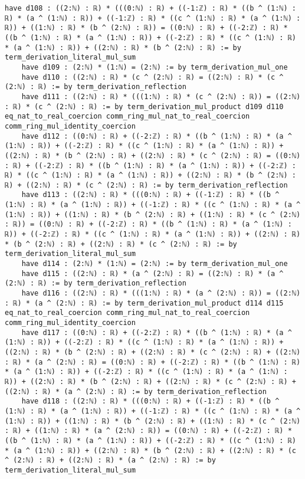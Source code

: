\documentclass{article}
\begin{document}
\begin{tcolorbox}[colback=white!10, width=\linewidth]
\begin{lstlisting}[language=Lean4]
    have d108 : ((2:ℕ) : ℝ) * (((0:ℕ) : ℝ) + ((-1:ℤ) : ℝ) * ((b ^ (1:ℕ) : ℝ) * (a ^ (1:ℕ) : ℝ)) + ((-1:ℤ) : ℝ) * ((c ^ (1:ℕ) : ℝ) * (a ^ (1:ℕ) : ℝ)) + ((1:ℕ) : ℝ) * (b ^ (2:ℕ) : ℝ)) = ((0:ℕ) : ℝ) + ((-2:ℤ) : ℝ) * ((b ^ (1:ℕ) : ℝ) * (a ^ (1:ℕ) : ℝ)) + ((-2:ℤ) : ℝ) * ((c ^ (1:ℕ) : ℝ) * (a ^ (1:ℕ) : ℝ)) + ((2:ℕ) : ℝ) * (b ^ (2:ℕ) : ℝ) := by term_derivation_literal_mul_sum
    have d109 : (2:ℕ) * (1:ℕ) = (2:ℕ) := by term_derivation_mul_one
    have d110 : ((2:ℕ) : ℝ) * (c ^ (2:ℕ) : ℝ) = ((2:ℕ) : ℝ) * (c ^ (2:ℕ) : ℝ) := by term_derivation_reflection
    have d111 : ((2:ℕ) : ℝ) * (((1:ℕ) : ℝ) * (c ^ (2:ℕ) : ℝ)) = ((2:ℕ) : ℝ) * (c ^ (2:ℕ) : ℝ) := by term_derivation_mul_product d109 d110 eq_nat_to_real_coercion comm_ring_mul_nat_to_real_coercion comm_ring_mul_identity_coercion
    have d112 : ((0:ℕ) : ℝ) + ((-2:ℤ) : ℝ) * ((b ^ (1:ℕ) : ℝ) * (a ^ (1:ℕ) : ℝ)) + ((-2:ℤ) : ℝ) * ((c ^ (1:ℕ) : ℝ) * (a ^ (1:ℕ) : ℝ)) + ((2:ℕ) : ℝ) * (b ^ (2:ℕ) : ℝ) + ((2:ℕ) : ℝ) * (c ^ (2:ℕ) : ℝ) = ((0:ℕ) : ℝ) + ((-2:ℤ) : ℝ) * ((b ^ (1:ℕ) : ℝ) * (a ^ (1:ℕ) : ℝ)) + ((-2:ℤ) : ℝ) * ((c ^ (1:ℕ) : ℝ) * (a ^ (1:ℕ) : ℝ)) + ((2:ℕ) : ℝ) * (b ^ (2:ℕ) : ℝ) + ((2:ℕ) : ℝ) * (c ^ (2:ℕ) : ℝ) := by term_derivation_reflection
    have d113 : ((2:ℕ) : ℝ) * (((0:ℕ) : ℝ) + ((-1:ℤ) : ℝ) * ((b ^ (1:ℕ) : ℝ) * (a ^ (1:ℕ) : ℝ)) + ((-1:ℤ) : ℝ) * ((c ^ (1:ℕ) : ℝ) * (a ^ (1:ℕ) : ℝ)) + ((1:ℕ) : ℝ) * (b ^ (2:ℕ) : ℝ) + ((1:ℕ) : ℝ) * (c ^ (2:ℕ) : ℝ)) = ((0:ℕ) : ℝ) + ((-2:ℤ) : ℝ) * ((b ^ (1:ℕ) : ℝ) * (a ^ (1:ℕ) : ℝ)) + ((-2:ℤ) : ℝ) * ((c ^ (1:ℕ) : ℝ) * (a ^ (1:ℕ) : ℝ)) + ((2:ℕ) : ℝ) * (b ^ (2:ℕ) : ℝ) + ((2:ℕ) : ℝ) * (c ^ (2:ℕ) : ℝ) := by term_derivation_literal_mul_sum
    have d114 : (2:ℕ) * (1:ℕ) = (2:ℕ) := by term_derivation_mul_one
    have d115 : ((2:ℕ) : ℝ) * (a ^ (2:ℕ) : ℝ) = ((2:ℕ) : ℝ) * (a ^ (2:ℕ) : ℝ) := by term_derivation_reflection
    have d116 : ((2:ℕ) : ℝ) * (((1:ℕ) : ℝ) * (a ^ (2:ℕ) : ℝ)) = ((2:ℕ) : ℝ) * (a ^ (2:ℕ) : ℝ) := by term_derivation_mul_product d114 d115 eq_nat_to_real_coercion comm_ring_mul_nat_to_real_coercion comm_ring_mul_identity_coercion
    have d117 : ((0:ℕ) : ℝ) + ((-2:ℤ) : ℝ) * ((b ^ (1:ℕ) : ℝ) * (a ^ (1:ℕ) : ℝ)) + ((-2:ℤ) : ℝ) * ((c ^ (1:ℕ) : ℝ) * (a ^ (1:ℕ) : ℝ)) + ((2:ℕ) : ℝ) * (b ^ (2:ℕ) : ℝ) + ((2:ℕ) : ℝ) * (c ^ (2:ℕ) : ℝ) + ((2:ℕ) : ℝ) * (a ^ (2:ℕ) : ℝ) = ((0:ℕ) : ℝ) + ((-2:ℤ) : ℝ) * ((b ^ (1:ℕ) : ℝ) * (a ^ (1:ℕ) : ℝ)) + ((-2:ℤ) : ℝ) * ((c ^ (1:ℕ) : ℝ) * (a ^ (1:ℕ) : ℝ)) + ((2:ℕ) : ℝ) * (b ^ (2:ℕ) : ℝ) + ((2:ℕ) : ℝ) * (c ^ (2:ℕ) : ℝ) + ((2:ℕ) : ℝ) * (a ^ (2:ℕ) : ℝ) := by term_derivation_reflection
    have d118 : ((2:ℕ) : ℝ) * (((0:ℕ) : ℝ) + ((-1:ℤ) : ℝ) * ((b ^ (1:ℕ) : ℝ) * (a ^ (1:ℕ) : ℝ)) + ((-1:ℤ) : ℝ) * ((c ^ (1:ℕ) : ℝ) * (a ^ (1:ℕ) : ℝ)) + ((1:ℕ) : ℝ) * (b ^ (2:ℕ) : ℝ) + ((1:ℕ) : ℝ) * (c ^ (2:ℕ) : ℝ) + ((1:ℕ) : ℝ) * (a ^ (2:ℕ) : ℝ)) = ((0:ℕ) : ℝ) + ((-2:ℤ) : ℝ) * ((b ^ (1:ℕ) : ℝ) * (a ^ (1:ℕ) : ℝ)) + ((-2:ℤ) : ℝ) * ((c ^ (1:ℕ) : ℝ) * (a ^ (1:ℕ) : ℝ)) + ((2:ℕ) : ℝ) * (b ^ (2:ℕ) : ℝ) + ((2:ℕ) : ℝ) * (c ^ (2:ℕ) : ℝ) + ((2:ℕ) : ℝ) * (a ^ (2:ℕ) : ℝ) := by term_derivation_literal_mul_sum

\end{lstlisting}
\end{tcolorbox}
\end{document}
